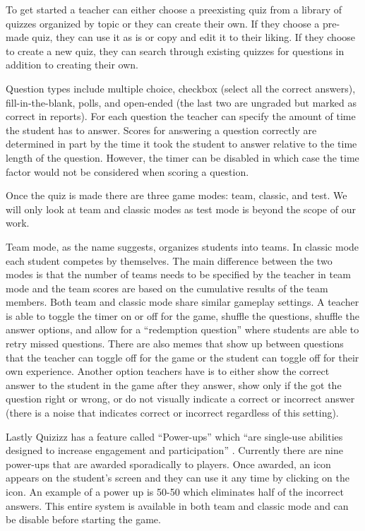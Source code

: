 \documentclass{article}
\begin{document}
        To get started a teacher can either choose a preexisting quiz from a library of quizzes organized by topic or they can create their own. If they choose a pre-made quiz, they can use it as is or copy and edit it to their liking. If they choose to create a new quiz, they can search through existing quizzes for questions in addition to creating their own.
        \smallskip
        
        Question types include multiple choice, checkbox (select all the correct answers), fill-in-the-blank, polls, and open-ended (the last two are ungraded but marked as correct in reports). For each question the teacher can specify the amount of time the student has to answer. Scores for answering a question correctly are determined in part by the time it took the student to answer relative to the time length of the question. However, the timer can be disabled in which case the time factor would not be considered when scoring a question.
        \smallskip
        
        Once the quiz is made there are three game modes: team, classic, and test. We will only look at team and classic modes as test mode is beyond the scope of our work.
        \smallskip
        
        Team mode, as the name suggests, organizes students into teams. In classic mode each student competes by themselves. The main difference between the two modes is that the number of teams needs to be specified by the teacher in team mode and the team scores are based on the cumulative results of the team members. Both team and classic mode share similar gameplay settings. A teacher is able to toggle the timer on or off for the game, shuffle the questions, shuffle the answer options, and allow for a ``redemption question'' where students are able to retry missed questions. There are also memes that show up between questions that the teacher can toggle off for the game or the student can toggle off for their own experience. Another option teachers have is to either show the correct answer to the student in the game after they answer, show only if the got the question right or wrong, or do not visually indicate a correct or incorrect answer (there is a noise that indicates correct or incorrect regardless of this setting).
        \smallskip
        
        Lastly Quizizz has a feature called ``Power-ups'' which ``are single-use abilities designed to increase engagement and participation'' \cite{quizizz}. Currently there are nine power-ups that are awarded sporadically to players. Once awarded, an icon appears on the student's screen and they can use it any time by clicking on the icon. An example of a power up is 50-50 which eliminates half of the incorrect answers. This entire system is available in both team and classic mode and can be disable before starting the game.
        \smallskip
        
\end{document}
